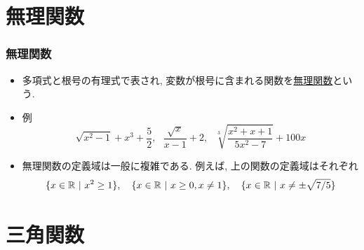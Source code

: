 

\section{無理関数}

\begin{frame}
\frametitle{無理関数}

\begin{itemize}
\item 
多項式と根号の有理式で表され, 変数が根号に含まれる関数を\underline{無理関数}という. 
\item 例
$$
\sqrt{x^2-1}+x^3+\frac{5}{2}, \ \ \ \frac{\sqrt{x}}{x-1}+2, \ \ \ \sqrt[3]{\frac{x^2+x+1}{5x^2-7}}+100x
$$
\item 無理関数の定義域は一般に複雑である. 例えば, 上の関数の定義域はそれぞれ
$$
\{x \in \R \ | \ x^2 \ge 1\}, \ \ \ \{x \in \R \ | \ x \ge 0, x \neq 1\}, \ \ \ \{x \in \R \ | \ x \neq \pm \sqrt{7/5}\}
$$
\end{itemize}

\end{frame}



\section{三角関数}


